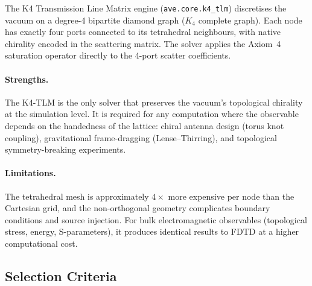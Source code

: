 The K4 Transmission Line Matrix engine (\texttt{ave.core.k4\_tlm}) discretises the vacuum on a degree-4 bipartite diamond graph ($K_4$ complete graph). Each node has exactly four ports connected to its tetrahedral neighbours, with native chirality encoded in the scattering matrix. The solver applies the Axiom~4 saturation operator directly to the 4-port scatter coefficients.

\paragraph{Strengths.} The K4-TLM is the only solver that preserves the vacuum's topological chirality at the simulation level. It is required for any computation where the observable depends on the handedness of the lattice: chiral antenna design (torus knot coupling), gravitational frame-dragging (Lense--Thirring), and topological symmetry-breaking experiments.

\paragraph{Limitations.} The tetrahedral mesh is approximately $4\times$ more expensive per node than the Cartesian grid, and the non-orthogonal geometry complicates boundary conditions and source injection. For bulk electromagnetic observables (topological stress, energy, S-parameters), it produces identical results to FDTD at a higher computational cost.

\subsection{Selection Criteria}

